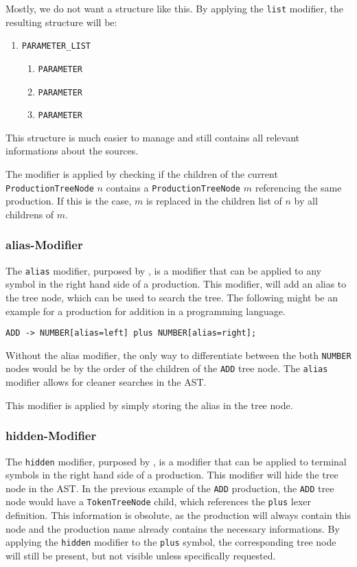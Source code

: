 Mostly, we do not want a structure like this. By applying the \verb|list| modifier, the resulting structure will be:

\begin{enumerate}
\item	\verb|PARAMETER_LIST|
\begin{enumerate}
\item \verb|PARAMETER|
\item \verb|PARAMETER|
\item \verb|PARAMETER|
\end{enumerate}
\end{enumerate}

This structure is much easier to manage and still contains all relevant informations about the sources.

The modifier is applied by checking if the children of the current \verb|ProductionTreeNode| $n$ contains a \verb|ProductionTreeNode| $m$ referencing the same production. If this is the case, $m$ is replaced in the children list of $n$ by all childrens of $m$.

\subsubsection{alias-Modifier}

The \verb|alias| modifier, purposed by \cite{GeneratingRewritableAST}, is a modifier that can be applied to any symbol in the right hand side of a production. This modifier, will add an alias to the tree node, which can be used to search the tree. The following might be an example for a production for addition in a programming language.

\begin{verbatim}
ADD -> NUMBER[alias=left] plus NUMBER[alias=right];
\end{verbatim}

Without the alias modifier, the only way to differentiate between the both \verb|NUMBER| nodes would be by the order of the children of the \verb|ADD| tree node. The \verb|alias| modifier allows for cleaner searches in the AST.

This modifier is applied by simply storing the alias in the tree node.


\subsubsection{hidden-Modifier}

The \verb|hidden| modifier, purposed by \cite{GeneratingRewritableAST}, is a modifier that can be applied to terminal symbols in the right hand side of a production. This modifier will hide the tree node in the AST. In the previous example of the \verb|ADD| production, the \verb|ADD| tree node would have a \verb|TokenTreeNode| child, which references the \verb|plus| lexer definition. This information is obsolute, as the production will always contain this node and the production name already contains the necessary informations. By applying the \verb|hidden| modifier to the \verb|plus| symbol, the corresponding tree node will still be present, but not visible unless specifically requested.


